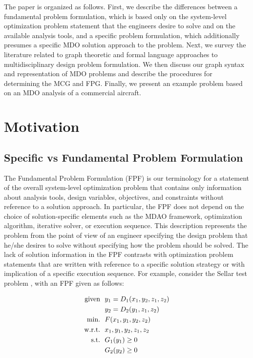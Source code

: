     The paper is organized as follows. First, we describe the differences between a fundamental problem
    formulation, which is based only on the system-level optimization problem statement that the
    engineers desire to solve and on the available analysis tools, and a specific problem formulation, which
    additionally presumes a specific MDO solution approach to the problem. Next, we survey the literature related to
    graph theoretic and formal language approaches to multidisciplinary design problem formulation. 
    We then discuss our graph syntax and representation of MDO problems and describe the procedures for 
    determining the MCG and FPG. Finally, we present an example problem based on an MDO analysis of a 
    commercial aircraft.

\section{Motivation}
\subsection{Specific vs Fundamental Problem Formulation }
	\label{s:specific vs fundamental}
    The Fundamental Problem Formulation (FPF) is our terminology for a statement of the overall system-level optimization problem that contains only  information about analysis tools, design variables, objectives, and constraints without reference to a solution approach. 
In particular, the FPF does not depend on the choice of solution-specific elements such as the MDAO framework, optimization algorithm, iterative solver, or execution sequence. 
This description represents  the problem from the point of view of an engineer specifying the design problem that he/she desires to solve without specifying how the problem should be solved. 
The lack of solution information in the FPF contrasts with optimization problem statements that are written with reference to a specific solution strategy or with implication of a specific execution sequence. 
For example, consider the Sellar test problem \cite{AIAA:sellar}, with an FPF given as follows:

    \begin{align}
        \textrm{given} & \ \ y_1 = D_1(x_1,y_2,z_1,z_2) \notag
        \\      & \ \ y_2 = D_2(y_1,z_1,z_2) \notag
        \\\textrm{min.} &\ \ F(x_1,y_1,y_2,z_2) \notag
        \\\textrm{w.r.t.} & \ \ x_1,y_1,y_2,z_1,z_2 \notag
        \\\textrm{s.t.} & \ \ G_1(y_1) \geq 0 \notag
        \\     & \ \ G_2(y_2) \geq 0
        \label{eqn:simple_fpf}
    \end{align}


